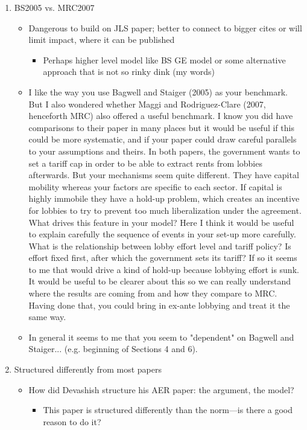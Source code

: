 \documentclass[12pt]{article}
\begin{document}
\begin{enumerate}
\newpage
	\item BS2005 vs. MRC2007
		\begin{itemize}
			\item Dangerous to build on JLS paper; better to connect to bigger cites or will limit impact, where it can be published
				\begin{itemize}
					\item Perhaps higher level model like BS GE model or some alternative approach that is not so rinky dink (my words)
				\end{itemize}
			\item I like the way you use Bagwell and Staiger (2005) as your benchmark.  But I also wondered whether Maggi and Rodriguez-Clare (2007, henceforth MRC) also offered a useful benchmark.  I know you did have comparisons to their paper in many places but it would be useful if this could be more systematic, and if your paper could draw careful parallels to your assumptions and theirs.  In both papers, the government wants to set a tariff cap in order to be able to extract rents from lobbies afterwards.  But your mechanisms seem quite different.  They have capital mobility whereas your factors are specific to each sector.  If capital is highly immobile they have a hold-up problem, which creates an incentive for lobbies to try to prevent too much liberalization under the agreement.  What drives this feature in your model?  Here I think it would be useful to explain carefully the sequence of events in your set-up more carefully.  What is the relationship between lobby effort level and tariff policy?  Is effort fixed first, after which the government sets its tariff?  If so it seems to me that would drive a kind of hold-up because lobbying effort is sunk.  It would be useful to be clearer about this so we can really understand where the results are coming from and how they compare to MRC.  Having done that, you could bring in ex-ante lobbying and treat it the same way. 
			\item In general it seems to me that you seem to "dependent" on Bagwell and Staiger... (e.g. beginning of Sections 4 and 6).
		\end{itemize}
	\item Structured differently from most papers
		\begin{itemize}
			\item How did Devashish structure his AER paper: the argument, the model?
				\begin{itemize}
					\item This paper is structured differently than the norm---is there a good reason to do it?

\end{itemize}
\end{itemize}
\end{enumerate}
\end{document}
